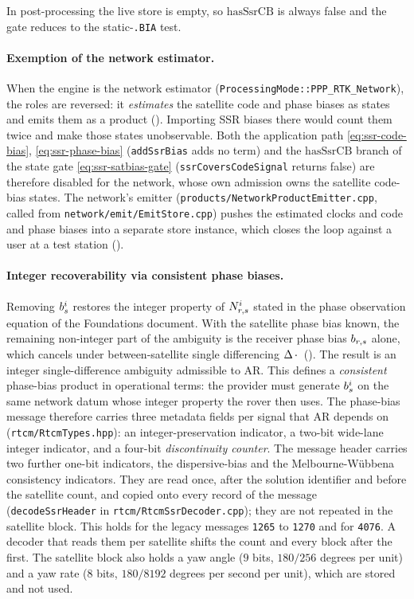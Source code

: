 \documentclass[main.tex]{subfiles}
\begin{document}
In post-processing the live store is empty, so
$\mathrm{hasSsrCB}$ is always false and the gate reduces to the
static-\texttt{.BIA} test.

\paragraph{Exemption of the network estimator.} When the engine is the
network estimator (\texttt{ProcessingMode::PPP\_RTK\_Network}), the roles
are reversed: it \emph{estimates} the satellite code and phase biases as
states and emits them as a product (). Importing SSR biases there would count them twice and make
those states unobservable. Both the application
path \eqref{eq:ssr-code-bias}, \eqref{eq:ssr-phase-bias}
(\texttt{addSsrBias} adds no term) and the $\mathrm{hasSsrCB}$ branch of the
state gate \eqref{eq:ssr-satbias-gate} (\texttt{ssrCoversCodeSignal} returns
false) are therefore disabled for the network, whose own admission owns the
satellite code-bias states. The network's emitter
(\texttt{products/NetworkProductEmitter.cpp}, called from
\texttt{network/emit/EmitStore.cpp}) pushes the
estimated clocks and code and phase biases into a separate store instance,
which closes the loop against a user at a test station
().

\paragraph{Integer recoverability via consistent phase biases.}
Removing $b^i_s$ restores the integer property of
$N^i_{r,s}$ stated in the phase observation equation of the
Foundations document. With the satellite phase bias known, the remaining
non-integer part of the ambiguity is the receiver phase bias
$b_{r,s}$ alone, which cancels under between-satellite
single differencing $\Delta \,\cdot\,$
(). The result is an
integer single-difference ambiguity admissible to AR. This defines a
\emph{consistent} phase-bias product in operational terms: the provider
must generate $b^i_s$ on the same network datum whose integer
property the rover then uses. The phase-bias message therefore carries
three metadata fields per signal that AR depends on
(\texttt{rtcm/RtcmTypes.hpp}): an integer-preservation indicator, a
two-bit wide-lane integer indicator, and a four-bit \emph{discontinuity
counter}. The message header carries two further one-bit indicators, the
dispersive-bias and the Melbourne-W\"ubbena consistency indicators. They are
read once, after the solution identifier and before the satellite count, and
copied onto every record of the message (\texttt{decodeSsrHeader} in
\texttt{rtcm/RtcmSsrDecoder.cpp}); they are not repeated in the satellite
block. This holds for the legacy messages \texttt{1265} to \texttt{1270} and
for \texttt{4076}. A decoder that reads them per satellite shifts the count
and every block after the first. The satellite block also holds a yaw angle
($9$ bits, $180/256$ degrees per unit) and a yaw rate ($8$ bits, $180/8192$
degrees per second per unit), which are stored and not used.
\end{document}
